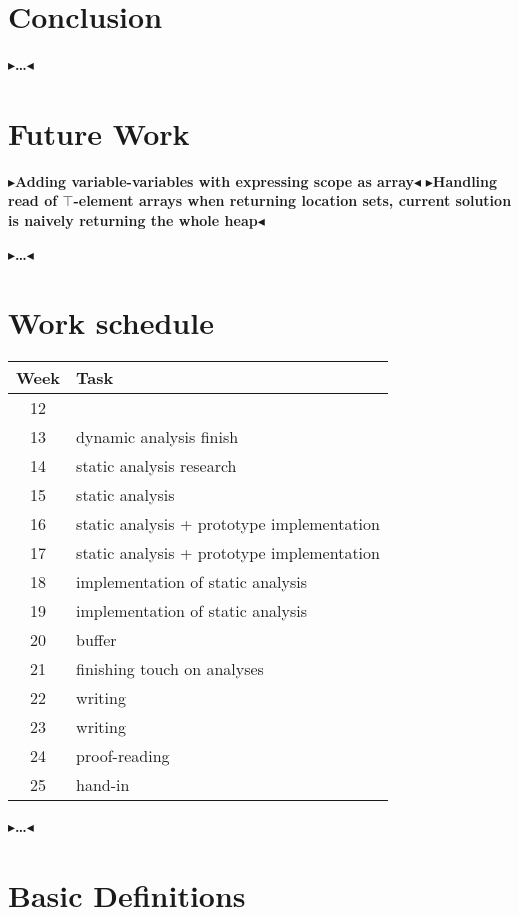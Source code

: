 \documentclass[twoside,11pt,openright]{report}
\theoremstyle{definition}
\newcommand{\todo}[1]{{\color[rgb]{.5,0,0}\textbf{$\blacktriangleright$#1$\blacktriangleleft$}}}
\begin{document}
\chapter{Conclusion}
\label{ch:conclusion}

\todo{\dots}

\chapter{Future Work}
\label{ch:futureWork}
\todo{Adding variable-variables with expressing scope as array}
\todo{Handling read of $\top$-element arrays when returning location sets, current solution is naively returning the whole heap}

\todo{\dots}


\chapter{Work schedule}

\begin{tabular}{c|l}
Week & Task \\\hline
12 & \\
13 & dynamic analysis finish \\ 
14 & static analysis research \\
15 & static analysis \\
16 & static analysis + prototype implementation \\
17 & static analysis + prototype implementation \\
18 & implementation of static analysis \\
19 & implementation of static analysis \\
20 & buffer \\
21 & finishing touch on analyses \\
22 & writing \\
23 & writing \\
24 & proof-reading \\
25 & hand-in 
\end{tabular}

\todo{\dots}

\newpage
\appendix
\chapter{Basic Definitions}
\label{app:lattice}

\end{document}
